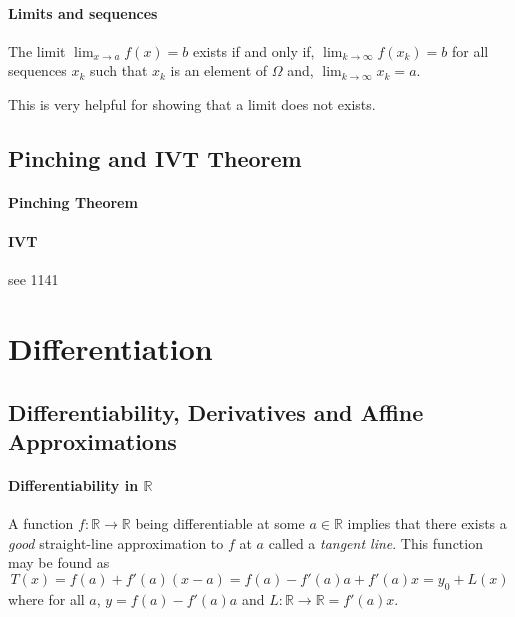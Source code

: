 \documentclass[12pt, letterpaper]{article}
\begin{document}
    \paragraph{Limits and sequences}
    The limit \(\lim_{x\to a} f(x) = b\) exists if and only if,
    \(\lim_{k\to\infty} f(x_k) = b\)  for all sequences \({x_k}\) such that 
    \(x_k\) is an element of \(\Omega\) and,
    \(\lim_{k\to\infty} x_k = a\).
    
    This is very helpful for showing that a limit does not exists.

    \subsection{Pinching and IVT Theorem}
    \paragraph{Pinching Theorem}
    \paragraph{IVT}
    see 1141
    
    
    
    

    \section{Differentiation}

    \subsection{Differentiability, Derivatives and Affine Approximations}

    \paragraph{Differentiability in \(\mathbb{R}\)}
    A function \(f: \mathbb{R}\to \mathbb{R}\) being differentiable at some \(a\in \mathbb{R}\)
    implies that there exists a \textit{good} straight-line approximation to \(f\) at \(a\) called a \textit{tangent line}.
    This function may be found as
    \[T(x) = f(a) + f'(a)(x-a) = f(a) -f'(a)a + f'(a)x = y_0 + L(x)\]
    where for all \(a\), \(y= f(a) - f'(a)a\) and \(L: \mathbb{R}\to \mathbb{R} = f'(a)x\).
\end{document}
